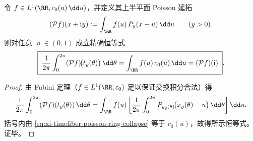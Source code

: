 \begin{proposition}\label{prop:xi-timefiber-poisson-projection-principle}
令 \(f\in L^1(\RR,c_0(u)\,\dd u)\)，并定义其上半平面 Poisson 延拓
\[
(\mathcal P f)(x+\mathrm{i}y):=\int_{\RR} f(u)\,P_y(x-u)\,\dd u
\qquad (y>0).
\]
则对任意 \(\varrho\in(0,1)\) 成立精确恒等式
\[
\boxed{\;
\frac{1}{2\pi}\int_{0}^{2\pi}(\mathcal P f)\!\bigl(t_\varrho(\theta)\bigr)\,\dd\theta
=\int_{\RR}f(u)\,c_0(u)\,\dd u
=(\mathcal P f)(\mathrm{i})\; }.
\]
\end{proposition}

\begin{proof}
由 Fubini 定理（\(f\in L^1(\RR,c_0)\) 足以保证交换积分合法）得
\[
\frac{1}{2\pi}\int_{0}^{2\pi}(\mathcal P f)(t_\varrho(\theta))\,\dd\theta
=\int_{\RR} f(u)\left[\frac{1}{2\pi}\int_{0}^{2\pi}P_{y_\varrho(\theta)}\!\bigl(x_\varrho(\theta)-u\bigr)\,\dd\theta\right]\dd u.
\]
括号内由 \eqref{eq:xi-timefiber-poisson-ring-collapse} 等于 \(c_0(u)\)，故得所示恒等式。证毕。
\end{proof}

\endinput
